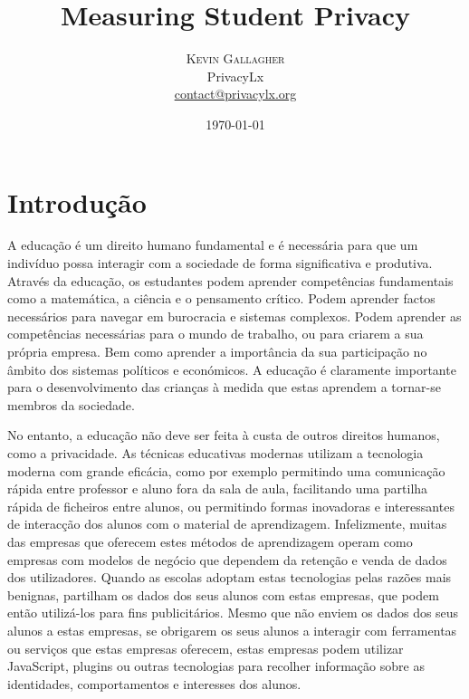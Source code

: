 \documentclass[twoside,twocolumn]{article}
\title{Measuring Student Privacy} %
\author{%
\textsc{Kevin Gallagher}\\%
\normalsize PrivacyLx \\ %
\normalsize \href{mailto:contact@privacylx.org}{contact@privacylx.org} %
}
\date{\today} %
\begin{document}
\maketitle


\section{Introdução}


A educação é um direito humano fundamental e é necessária para que um indivíduo possa interagir com a sociedade de forma significativa e produtiva. Através da educação, os estudantes podem aprender competências fundamentais como a matemática, a ciência e o pensamento crítico. Podem aprender factos necessários para navegar em burocracia e sistemas complexos. Podem aprender as competências necessárias para o mundo de trabalho, ou para criarem a sua própria empresa. Bem como aprender a importância da sua participação no âmbito dos sistemas políticos e económicos. A educação é claramente importante para o desenvolvimento das crianças à medida que estas aprendem a tornar-se membros da sociedade.


No entanto, a educação não deve ser feita à custa de outros direitos humanos, como a privacidade. As técnicas educativas modernas utilizam a tecnologia moderna com grande eficácia, como por exemplo permitindo uma comunicação rápida entre professor e aluno fora da sala de aula, facilitando uma partilha rápida de ficheiros entre alunos, ou permitindo formas inovadoras e interessantes de interacção dos alunos com o material de aprendizagem. Infelizmente, muitas das empresas que oferecem estes métodos de aprendizagem operam como empresas com modelos de negócio que dependem da retenção e venda de dados dos utilizadores. Quando as escolas adoptam estas tecnologias pelas razões mais benignas, partilham os dados dos seus alunos com estas empresas, que podem então utilizá-los para fins publicitários. Mesmo que não enviem os dados dos seus alunos a estas empresas, se obrigarem os seus alunos a interagir com ferramentas ou serviços que estas empresas oferecem, estas empresas podem utilizar JavaScript, plugins ou outras tecnologias para recolher informação sobre as identidades, comportamentos e interesses dos alunos. 
\end{document}

